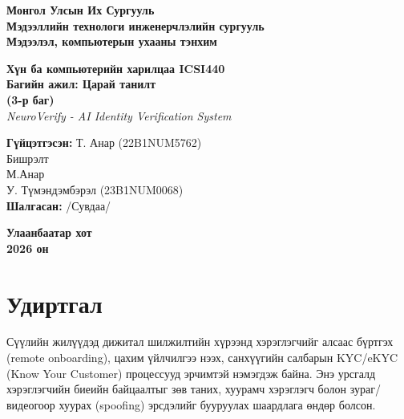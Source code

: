\documentclass[12pt,a4paper]{article}
\begin{document}
\begin{titlepage}
\begin{center}
\textbf{Монгол Улсын Их Сургууль}\\
\textbf{Мэдээллийн технологи инженерчлэлийн сургууль}\\
\textbf{Мэдээлэл, компьютерын ухааны тэнхим}

\vspace{2.5cm}

{\Large \textbf{Хүн ба компьютерийн харилцаа ICSI440}}\\[1cm]
{\LARGE \textbf{Багийн ажил: Царай танилт}}\\[0.5cm]
{\large \textbf{(3-р баг)}}\\[0.5cm]
{\large \textit{NeuroVerify - AI Identity Verification System}}

\vspace{2.5cm}

\begin{flushleft}
\hspace{2cm}\textbf{Гүйцэтгэсэн:} \dotfill Т. Анар (22B1NUM5762) \\[0.3cm]
\hspace{5.5cm} Бишрэлт \\[0.3cm]
\hspace{5.5cm} М.Анар \\[0.3cm]
\hspace{5.5cm} У. Түмэндэмбэрэл (23B1NUM0068) \\[0.8cm]
\hspace{2cm}\textbf{Шалгасан:} \dotfill /Сувдаа/
\end{flushleft}

\vfill

\textbf{Улаанбаатар хот}\\
\textbf{2026 он}
\end{center}
\end{titlepage}

\tableofcontents
\newpage

\section{Удиртгал}

Сүүлийн жилүүдэд дижитал шилжилтийн хүрээнд хэрэглэгчийг алсаас бүртгэх (remote onboarding), цахим үйлчилгээ нээх, санхүүгийн салбарын KYC/eKYC (Know Your Customer) процессууд эрчимтэй нэмэгдэж байна. Энэ урсгалд хэрэглэгчийн биеийн байцаалтыг зөв таних, хуурамч хэрэглэгч болон зураг/видеогоор хуурах (spoofing) эрсдэлийг бууруулах шаардлага өндөр болсон.
\end{document}
